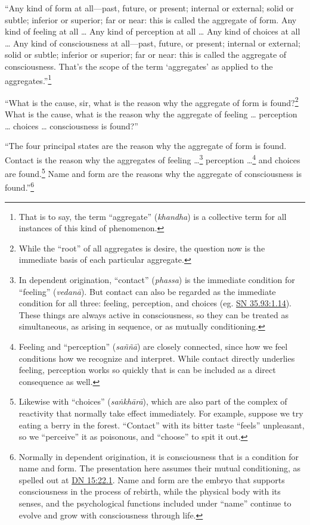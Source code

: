 \documentclass[12pt,openany]{book}%
\begin{document}
“Any kind of form at all—past, future, or present; internal or external; solid or subtle; inferior or superior; far or near: this is called the aggregate of form. Any kind of feeling at all … Any kind of perception at all … Any kind of choices at all … Any kind of consciousness at all—past, future, or present; internal or external; solid or subtle; inferior or superior; far or near: this is called the aggregate of consciousness. That’s the scope of the term ‘aggregates’ as applied to the aggregates.”\footnote{That is to say, the term “aggregate” (\textit{khandha}) is a collective term for all instances of this kind of phenomenon. } 

“What is the cause, sir, what is the reason why the aggregate of form is found?\footnote{While the “root” of all aggregates is desire, the question now is the immediate basis of each particular aggregate. } What is the cause, what is the reason why the aggregate of feeling … perception … choices … consciousness is found?” 

“The four principal states are the reason why the aggregate of form is found. Contact is the reason why the aggregates of feeling …\footnote{In dependent origination, “contact” (\textit{phassa}) is the immediate condition for “feeling” (\textit{\textsanskrit{vedanā}}). But contact can also be regarded as the immediate condition for all three: feeling, perception, and choices (eg. \href{https://suttacentral.net/sn35.93/en/sujato\#1.14}{SN 35.93:1.14}). These things are always active in consciousness, so they can be treated as simultaneous, as arising in sequence, or as mutually conditioning. } perception …\footnote{Feeling and “perception” (\textit{\textsanskrit{saññā}}) are closely connected, since how we feel conditions how we recognize and interpret. While contact directly underlies feeling, perception works so quickly that is can be included as a direct consequence as well. } and choices are found.\footnote{Likewise with “choices” (\textit{\textsanskrit{saṅkhārā}}), which are also part of the complex of reactivity that normally take effect immediately. For example, suppose we try eating a berry in the forest. “Contact” with its bitter taste “feels” unpleasant, so we “perceive” it as poisonous, and “choose” to spit it out. } Name and form are the reasons why the aggregate of consciousness is found.”\footnote{Normally in dependent origination, it is consciousness that is a condition for name and form. The presentation here assumes their mutual conditioning, as spelled out at \href{https://suttacentral.net/dn15/en/sujato\#22.1}{DN 15:22.1}. Name and form are the embryo that supports consciousness in the process of rebirth, while the physical body with its senses, and the psychological functions included under “name” continue to evolve and grow with consciousness through life. } 
\end{document}
